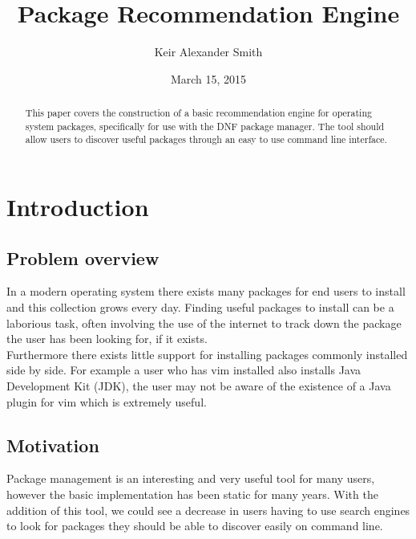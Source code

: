 \documentclass{l4proj}
\begin{document}
\title{Package Recommendation Engine}
\author{Keir Alexander Smith}
\date{March 15, 2015}
\maketitle
 
\begin{abstract}
This paper covers the construction of a basic recommendation engine for operating system packages, specifically for use with the DNF package manager. The tool should allow users to discover useful packages through an easy to use command line interface. 
\end{abstract}
 
\tableofcontents
 
 
\chapter{Introduction}
 
\section{Problem overview}
In a modern operating system there exists many packages for end users to install and this collection grows every day. Finding useful packages to install can be a laborious task, often involving the use of the internet to track down the package the user has been looking for, if it exists.\\
Furthermore there exists little support for installing packages commonly installed side by side. For example a user who has vim installed also installs Java Development Kit (JDK), the user may not be aware of the existence of a Java plugin for vim which is extremely useful.

\section{Motivation}
Package management is an interesting and very useful tool for many users, however the basic implementation has been static for many years. With the addition of this tool, we could see a decrease in users having to use search engines to look for packages they should be able to discover easily on command line. 
 
\end{document}
